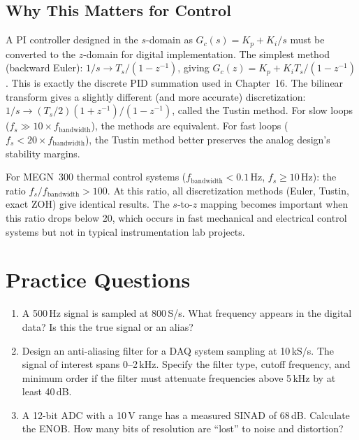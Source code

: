\documentclass[11pt,letterpaper,twoside,openany]{book}
\begin{document}
\subsection{Why This Matters for Control}
A PI controller designed in the $s$-domain as $G_c(s) = K_p + K_i/s$ must be converted to the $z$-domain for digital implementation. The simplest method (backward Euler): $1/s \to T_s/(1 - z^{-1})$, giving $G_c(z) = K_p + K_i T_s / (1 - z^{-1})$. This is exactly the discrete PID summation used in Chapter~16. The bilinear transform gives a slightly different (and more accurate) discretization: $1/s \to (T_s/2)(1 + z^{-1})/(1 - z^{-1})$, called the Tustin method. For slow loops ($f_s \gg 10 \times f_{\text{bandwidth}}$), the methods are equivalent. For fast loops ($f_s < 20 \times f_{\text{bandwidth}}$), the Tustin method better preserves the analog design's stability margins.

\begin{tipbox}
For MEGN~300 thermal control systems ($f_{\text{bandwidth}} < 0.1$\,Hz, $f_s \geq 10$\,Hz): the ratio $f_s/f_{\text{bandwidth}} > 100$. At this ratio, all discretization methods (Euler, Tustin, exact ZOH) give identical results. The $s$-to-$z$ mapping becomes important when this ratio drops below 20, which occurs in fast mechanical and electrical control systems but not in typical instrumentation lab projects.
\end{tipbox}
\section{Practice Questions}
\begin{enumerate}[leftmargin=1.5em]
\item A 500\,Hz signal is sampled at 800\,S/s. What frequency appears in the digital data? Is this the true signal or an alias?
\item Design an anti-aliasing filter for a DAQ system sampling at 10\,kS/s. The signal of interest spans 0--2\,kHz. Specify the filter type, cutoff frequency, and minimum order if the filter must attenuate frequencies above 5\,kHz by at least 40\,dB.
\item A 12-bit ADC with a 10\,V range has a measured SINAD of 68\,dB. Calculate the ENOB. How many bits of resolution are ``lost'' to noise and distortion?
\end{enumerate}
\end{document}
